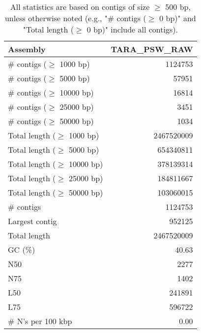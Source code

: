 \documentclass[12pt,a4paper]{article}
\begin{document}
\begin{table}[ht]
\begin{center}
\caption{All statistics are based on contigs of size $\geq$ 500 bp, unless otherwise noted (e.g., "\# contigs ($\geq$ 0 bp)" and "Total length ($\geq$ 0 bp)" include all contigs).}
\begin{tabular}{|l*{1}{|r}|}
\hline
Assembly & TARA\_PSW\_RAW \\ \hline
\# contigs ($\geq$ 1000 bp) & 1124753 \\ \hline
\# contigs ($\geq$ 5000 bp) & 57951 \\ \hline
\# contigs ($\geq$ 10000 bp) & 16814 \\ \hline
\# contigs ($\geq$ 25000 bp) & 3451 \\ \hline
\# contigs ($\geq$ 50000 bp) & 1034 \\ \hline
Total length ($\geq$ 1000 bp) & 2467520009 \\ \hline
Total length ($\geq$ 5000 bp) & 654340811 \\ \hline
Total length ($\geq$ 10000 bp) & 378139314 \\ \hline
Total length ($\geq$ 25000 bp) & 184811667 \\ \hline
Total length ($\geq$ 50000 bp) & 103060015 \\ \hline
\# contigs & 1124753 \\ \hline
Largest contig & 952125 \\ \hline
Total length & 2467520009 \\ \hline
GC (\%) & 40.63 \\ \hline
N50 & 2277 \\ \hline
N75 & 1402 \\ \hline
L50 & 241891 \\ \hline
L75 & 596722 \\ \hline
\# N's per 100 kbp & 0.00 \\ \hline
\end{tabular}
\end{center}
\end{table}
\end{document}
